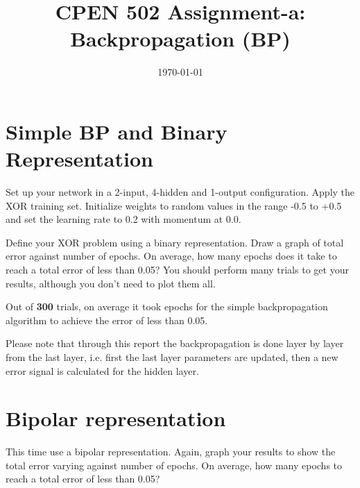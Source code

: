 \documentclass[a4paper,12pt]{article}
\title{CPEN 502 Assignment-a: Backpropagation (BP)}
\author{\authorName}
\date{\today}
\begin{document}
\maketitle

\section{Simple BP and Binary Representation}
Set up your network in a 2-input, 4-hidden and 1-output configuration. Apply the XOR training set. Initialize weights to random values in the range -0.5 to +0.5 and set the learning rate to 0.2 with momentum at 0.0.

Define your XOR problem using a binary representation. Draw a graph of total error against number of epochs. On average, how many epochs does it take to reach a total error of less than 0.05? You should perform many trials to get your results, although you don’t need to plot them all.

\begin{center}


\end{center}

Out of \textbf{300} trials, on average it took \textbf{} epochs for the simple backpropagation algorithm to achieve the error of less than 0.05. 

Please note that through this report the backpropagation is done layer by layer from the last layer, i.e. first the last layer parameters are updated, then a new error signal is calculated for the hidden layer. 

\section{Bipolar representation}
This time use a bipolar representation. Again, graph your results to show the total error varying against number of epochs. On average, how many epochs to reach a total error of less than 0.05?


\begin{center}


\end{center}
\end{document}
